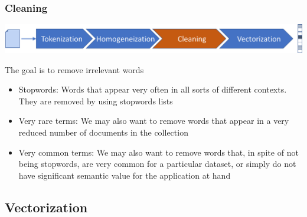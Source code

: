 \documentclass{beamer}
\begin{document}
\begin{frame}

    \frametitle{Cleaning}

    \centerline{\includegraphics[width=\textwidth]{./figs/NLPTM_cleaning.png}}

    The goal is to remove irrelevant words
    		\begin{itemize}
    			\item Stopwords: Words that appear very often in all sorts of different contexts. They are removed by using stopwords lists
    			\item Very rare terms: We may also want to remove words that appear in a very reduced number of documents in the collection
    			\item Very common terms: We may also want to remove words that, in spite of not being stopwords, are very common for a particular dataset, or simply do not have significant semantic value for the application at hand
    		\end{itemize}
    			
    
\end{frame}


\subsection{Vectorization}
\end{document}
